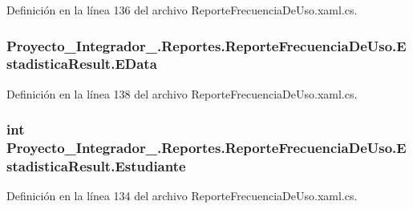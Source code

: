 Definición en la línea 136 del archivo Reporte\-Frecuencia\-De\-Uso.\-xaml.\-cs.

\hypertarget{struct_proyecto___integrador__3_1_1_reportes_1_1_reporte_frecuencia_de_uso_1_1_estadistica_result_a658dfafbad0962130a3ee73c8b5f1c4b}{
\subsubsection[{E\-Data}]{ Proyecto\-\_\-\-Integrador\-\_.\-Reportes.\-Reporte\-Frecuencia\-De\-Uso.\-Estadistica\-Result.\-E\-Data}}\label{struct_proyecto___integrador__3_1_1_reportes_1_1_reporte_frecuencia_de_uso_1_1_estadistica_result_a658dfafbad0962130a3ee73c8b5f1c4b}


Definición en la línea 138 del archivo Reporte\-Frecuencia\-De\-Uso.\-xaml.\-cs.

\hypertarget{struct_proyecto___integrador__3_1_1_reportes_1_1_reporte_frecuencia_de_uso_1_1_estadistica_result_a5e294c376eacca0ef132c57203b06e2d}{
\subsubsection[{Estudiante}]{\setlength{\rightskip}{0pt plus 5cm}int Proyecto\-\_\-\-Integrador\-\_.\-Reportes.\-Reporte\-Frecuencia\-De\-Uso.\-Estadistica\-Result.\-Estudiante}}\label{struct_proyecto___integrador__3_1_1_reportes_1_1_reporte_frecuencia_de_uso_1_1_estadistica_result_a5e294c376eacca0ef132c57203b06e2d}


Definición en la línea 134 del archivo Reporte\-Frecuencia\-De\-Uso.\-xaml.\-cs.

